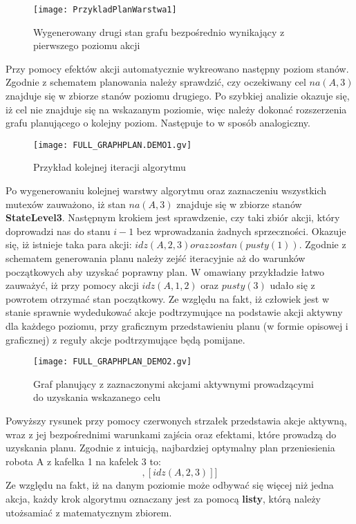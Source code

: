     \begin{figure}[H]
        \texttt{[image: PrzykladPlanWarstwa1]}
        \centering
        \caption{Wygenerowany drugi stan grafu bezpośrednio wynikający z pierwszego poziomu akcji}
        \label{PrzykladPlanW1}
    \end{figure}

    Przy pomocy efektów akcji automatycznie wykreowano następny poziom stanów. Zgodnie z schematem planowania należy sprawdzić, czy oczekiwany cel
    $na(A,3)$ znajduje się w zbiorze stanów poziomu drugiego. Po szybkiej analizie okazuje się, iż cel nie znajduje się na wskazanym poziomie, więc
    należy dokonać rozszerzenia grafu planującego o kolejny poziom. Następuje to w sposób analogiczny.

    \begin{figure}[H]
        \texttt{[image: FULL\_GRAPHPLAN.DEMO1.gv]}
        \centering
        \caption{Przykład kolejnej iteracji algorytmu}
        \label{PrzykladPlanW1}
    \end{figure}

    Po wygenerowaniu kolejnej warstwy algorytmu oraz zaznaczeniu wszystkich mutexów zauważono, iż stan $na(A,3)$ znajduje się w zbiorze stanów 
    \textbf{StateLevel3}. Następnym krokiem jest sprawdzenie, czy taki zbiór akcji, który doprowadzi nas do stanu $i-1$ bez wprowadzania żadnych sprzeczności.
    Okazuje się, iż istnieje taka para akcji: $idz(A,2,3) oraz zostan(pusty(1))$. Zgodnie z schematem generowania planu należy zejść iteracyjnie aż do 
    warunków początkowych aby uzyskać poprawny plan. W omawiany przykładzie łatwo zauważyć, iż przy pomocy akcji $idz(A,1,2)$ oraz $pusty(3)$ udało się 
    z powrotem otrzymać stan początkowy. Ze względu na fakt, iż człowiek jest w stanie sprawnie wydedukować akcje podtrzymujące na podstawie 
    akcji aktywny dla każdego poziomu, przy graficznym przedstawieniu planu (w formie opisowej i graficznej) z reguły akcje podtrzymujące będą 
    pomijane.

    \begin{figure}[H]
        \texttt{[image: FULL\_GRAPHPLAN\_DEMO2.gv]}
        \centering
        \caption{Graf planujący z zaznaczonymi akcjami aktywnymi prowadzącymi do uzyskania wskazanego celu}
        \label{PrzykladPlanW1}
    \end{figure}

    Powyższy rysunek przy pomocy czerwonych strzałek przedstawia akcje aktywną, wraz z jej bezpośrednimi warunkami zajścia oraz efektami, które 
    prowadzą do uzyskania planu. Zgodnie z intuicją, najbardziej optymalny plan przeniesienia robota A z kafelka 1 na kafelek 3 to:
    \begin{equation}
        [[idz(A,1,2)],[idz(A,2,3)]]
    \end{equation}
    Ze względu na fakt, iż na danym poziomie może odbywać się więcej niż jedna akcja, każdy krok algorytmu oznaczany jest za pomocą \textbf{listy}, 
    którą należy utożsamiać z matematycznym zbiorem.

